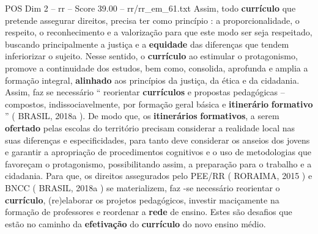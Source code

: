 \begin{textsample}{POS Dim 2 – rr – Score 39.00 – rr/rr\_em\_61.txt}
Assim, todo \textbf{currículo} que pretende assegurar direitos, precisa ter como princípio : a proporcionalidade, o respeito, o reconhecimento e a valorização para que este modo ser seja respeitado, buscando principalmente a justiça e a \textbf{equidade} das diferenças que tendem inferiorizar o sujeito.
Nesse sentido, o \textbf{currículo} ao estimular o protagonismo, promove a continuidade dos estudos, bem como, consolida, aprofunda e amplia a formação integral, \textbf{alinhado} aos princípios da justiça, da ética e da cidadania.
Assim, faz se necessário “ reorientar \textbf{currículos} e propostas pedagógicas – compostos, indissociavelmente, por formação geral básica e \textbf{itinerário} \textbf{formativo} ” ( BRASIL, 2018a ).
De modo que, os \textbf{itinerários} \textbf{formativos}, a serem \textbf{ofertado} pelas escolas do território precisam considerar a realidade local nas suas diferenças e especificidades, para tanto deve considerar os anseios dos jovens e garantir a apropriação de procedimentos cognitivos e o uso de metodologias que favoreçam o protagonismo, possibilitando assim, a preparação para o trabalho e a cidadania.
Para que, os direitos assegurados pelo PEE/RR ( RORAIMA, 2015 ) e BNCC ( BRASIL, 2018a ) se materializem, faz -se necessário reorientar o \textbf{currículo}, (re)elaborar os projetos pedagógicos, investir maciçamente na formação de professores e reordenar a \textbf{rede} de ensino.
Estes são desafios que estão no caminho da \textbf{efetivação} do \textbf{currículo} do novo ensino médio.

\end{textsample}
